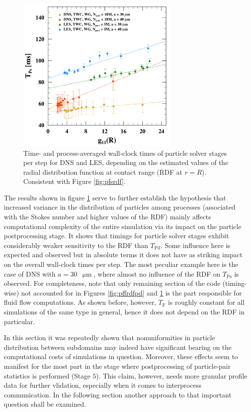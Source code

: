\documentclass{pracamgren}
\begin{document}
\begin{figure}[h]
\centering
\includegraphics[width=8cm]{figures/3-14_pffrdfps.pdf}
\caption{
Time- and process-averaged wall-clock times of particle solver stages per step for DNS and LES, depending on the estimated values of the radial distribution function at contact range (RDF at $r=R$).
Consistent with Figure \ref{fig:pfsrdf}.
}
\label{fig:pffrdfps}
\end{figure}

The results shown in figure \ref{fig:pffrdfps} serve to further establish the hypothesis that increased variance in the distribution of particles among processes (associated with the Stokes number and higher values of the RDF) mainly affects computational complexity of the entire simulation via its impact on the particle postprocessing stage.
It shows that timings for particle solver stages exhibit considerably weaker sensitivity to the RDF than $T_{\text{Pd}}$.
Some influence here is expected and observed but in absolute terms it does not have as striking impact on the overall wall-clock times per step.
The most peculiar example here is the case of DNS with $a = 30$~$\upmu\text{m}$, where almost no influence of the RDF on $T_{\text{Ps}}$ is observed.
For completeness, note that only remaining section of the code (timing-wise) not accounted for in Figures \ref{fig:pffrdfpd} and \ref{fig:pffrdfps} is the part responsible for fluid flow computations.
As shown before, however, $T_{\text{F}}$ is roughly constant for all simulations of the same type in general, hence it does not depend on the RDF in particular.

In this section it was repeatedly shown that nonuniformities in particle distribution between subdomains may indeed have significant bearing on the computational costs of simulations in question.
Moreover, these effects seem to manifest for the most part in the stage where postprocessing of particle-pair statistics is performed (Stage $5$).
This claim, however, needs more granular profile data for further vlidation, especially when it comes to interprocess communication.
In the following section another approach to that important question shall be examined.
\end{document}

